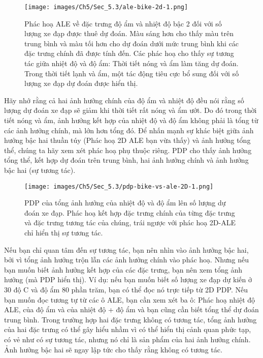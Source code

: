 \begin{figure*}[h!]
	\centering
	\texttt{[image: images/Ch5/Sec\_5.3/ale-bike-2d-1.png]}
	\label{fig:5_20}
	\caption{Phác hoạ ALE về đặc trưng độ ẩm và nhiệt độ bậc 2 đối với số lượng xe đạp được thuê dự đoán. Màu sáng hơn cho thấy màu trên trung bình và màu tối hơn cho dự đoán dưới mức trung bình khi các đặc trưng chính đã được tính đến. Các phác hoạ cho thấy sự tương tác giữa nhiệt độ và độ ẩm: Thời tiết nóng và ẩm làm tăng dự đoán. Trong thời tiết lạnh và ẩm, một tác động tiêu cực bổ sung đối với số lượng xe đạp dự đoán được hiển thị.}
\end{figure*}

Hãy nhớ rằng cả hai ảnh hưởng chính của độ ẩm và nhiệt độ đều nói rằng số lượng dự đoán xe đạp sẽ giảm khi thời tiết rất nóng và ẩm ướt. Do đó trong thời tiết nóng và ẩm, ảnh hưởng kết hợp của nhiệt độ và độ ẩm không phải là tổng từ các ảnh hưởng chính, mà lớn hơn tổng đó. Để nhấn mạnh sự khác biệt giữa ảnh hưởng bậc hai thuần túy (Phác hoạ 2D ALE bạn vừa thấy) và ảnh hưởng tổng thể, chúng ta hãy xem xét phác hoạ phụ thuộc riêng. PDP cho thấy ảnh hưởng tổng thể, kết hợp dự đoán trên trung bình, hai ảnh hưởng chính và ảnh hưởng bậc hai (sự tương tác).


\begin{figure*}[h!]
	\centering
	\texttt{[image: images/Ch5/Sec\_5.3/pdp-bike-vs-ale-2D-1.png]}
	\label{fig:5_21}
	\caption{PDP của tổng ảnh hưởng của nhiệt độ và độ ẩm lên số lượng dự đoán xe đạp. Phác hoạ kết hợp đặc trưng chính của từng đặc trưng và đặc trưng tương tác của chúng, trái ngược với phác hoạ 2D-ALE chỉ hiển thị sự tương tác.}
\end{figure*}

Nếu bạn chỉ quan tâm đến sự tương tác, bạn nên nhìn vào ảnh hưởng bậc hai, bởi vì tổng ảnh hưởng trộn lẫn các ảnh hưởng chính vào phác hoạ. Nhưng nếu bạn muốn biết ảnh hưởng kết hợp của các đặc trưng, bạn nên xem tổng ảnh hưởng (mà PDP hiển thị). Ví dụ: nếu bạn muốn biết số lượng xe đạp dự kiến ở 30 độ C và độ ẩm 80 phần trăm, bạn có thể đọc nó trực tiếp từ 2D PDP. Nếu bạn muốn đọc tương tự từ các ô ALE, bạn cần xem xét ba ô: Phác hoạ nhiệt độ ALE, của độ ẩm và của nhiệt độ + độ ẩm và bạn cũng cần biết tổng thể dự đoán trung bình. Trong trường hợp hai đặc trưng không có tương tác, tổng ảnh hưởng của hai đặc trưng có thể gây hiểu nhầm vì có thể hiển thị cảnh quan phức tạp, có vẻ như có sự tương tác, nhưng nó chỉ là sản phẩm của hai ảnh hưởng chính. Ảnh hưởng bậc hai sẽ ngay lập tức cho thấy rằng không có tương tác.

